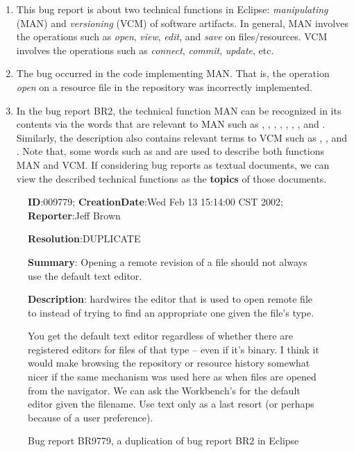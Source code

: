 \begin{enumerate}

\item This bug report is about two technical functions in Eclipse:
\emph{manipulating} (MAN) and \emph{versioning} (VCM) of software
artifacts. In general, MAN involves the operations such as \emph{open},
\emph{view}, \emph{edit}, and \emph{save} on files/resources. VCM
involves the operations such as \emph{connect}, \emph{commit},
\emph{update}, etc.

\item The bug occurred in the code implementing MAN. That is, the operation
\emph{open} on a resource file in the repository was incorrectly
implemented.

\item In the bug report BR2, the technical function MAN can be recognized
in its contents via the words that are relevant to MAN such as
, , , ,
, , , and .
Similarly, the description also contains relevant terms to VCM such as
, , and . Note that, some
words such as  and  are used to describe
both functions MAN and VCM. If considering bug reports as textual
documents, we can view the described technical functions as the
\textbf{topics} of those documents.

\end{enumerate}

\begin{figure}
\sf
\small
\textbf{ID}:009779; \textbf{CreationDate}:Wed Feb 13 15:14:00 CST 2002; \textbf{Reporter}:Jeff Brown

\textbf{Resolution}:DUPLICATE

\textbf{Summary}: Opening a remote revision of a file should not always use the default text editor.

\textbf{Description}:  hardwires the editor
that is used to open remote file to
 instead of trying to find an
appropriate one given the file's type.

You get the default text editor regardless of whether there are
registered editors for files of that type -- even if it's binary. I
think it would make browsing the repository or resource history
somewhat nicer if the same mechanism was used here as when files are
opened from the navigator. We can ask the Workbench's
 for the default editor given the
filename. Use text only as a last resort (or perhaps because of a
user preference).  \rm
\caption{Bug report BR9779, a duplication of bug report BR2 in Eclipse}
\label{fig:br2}
\end{figure}

